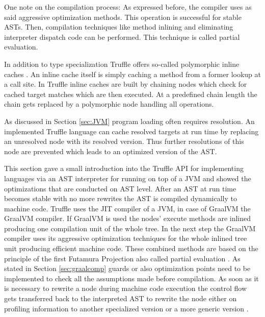 One note on the compilation process: As expressed before, the compiler uses as said aggressive optimization methods. This operation is successful for stable ASTs. Then, compilation techniques like method inlining and eliminating interpreter dispatch code can be performed. This technique is called partial evaluation.

In addition to type specialization Truffle offers so-called polymorphic inline caches \cite{ChambOpti}. An inline cache itself is simply caching a method from a former lookup at a call site. In Truffle inline caches are built by chaining nodes which check for cached target matches which are then executed. At a predefined chain length the chain gets replaced by a polymorphic node handling all operations.

As discussed in Section \ref{sec:JVM} program loading often requires resolution. An implemented Truffle language can cache resolved targets at run time by replacing an unresolved node with its resolved version. Thus further resolutions of this node are prevented which leads to an optimized version of the AST.

This section gave a small introduction into the Truffle API for implementing languages via an AST interpreter for running on top of a JVM and showed the optimizations that are conducted on AST level. After an AST at run time becomes stable with no more rewrites the AST is compiled dynamically to machine code. Truffle uses the JIT compiler of a JVM, in case of GraalVM the GraalVM compiler. If GraalVM is used the nodes' execute methods are inlined producing one compilation unit of the whole tree. In the next step the GraalVM compiler uses its aggressive optimization techniques for the whole inlined tree unit producing efficient machine code. These combined methods are based on the principle of the first Futamura Projection also called partial evaluation \cite{FutaPart}. As stated in Section \ref{sec:graalcomp} guards or also optimization points need to be implemented to check all the assumptions made before compilation. As soon as it is necessary to rewrite a node during machine code execution the control flow gets transferred back to the interpreted AST to rewrite the node either on profiling information to another specialized version or a more generic version \cite{ChambDeopt}.

